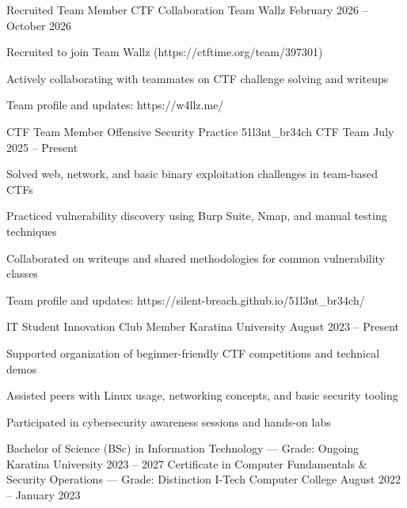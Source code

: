 \documentclass[]{resume-format}
\begin{document}
\begin{cventries}
    \cventry
    { Recruited Team Member \textbar{} CTF Collaboration }
    { Team Wallz }
    {}
    { February 2026 – October 2026 }
    {\begin{cvitems}
        \item { Recruited to join Team Wallz (https://ctftime.org/team/397301) }
        \item { Actively collaborating with teammates on CTF challenge solving and writeups }
        \item { Team profile and updates: https://w4llz.me/ }
    \end{cvitems}}
    \cventry
    { CTF Team Member \textbar{} Offensive Security Practice }
    { 51l3nt\_br34ch CTF Team }
    {}
    { July 2025 – Present }
    {\begin{cvitems}
        \item { Solved web, network, and basic binary exploitation challenges in team-based CTFs }
        \item { Practiced vulnerability discovery using Burp Suite, Nmap, and manual testing techniques }
        \item { Collaborated on writeups and shared methodologies for common vulnerability classes }
        \item { Team profile and updates: https://silent-breach.github.io/51l3nt\_br34ch/ }
    \end{cvitems}}
    \cventry
    { IT Student \textbar{} Innovation Club Member }
    { Karatina University }
    {}
    { August 2023 – Present }
    {\begin{cvitems}
        \item { Supported organization of beginner-friendly CTF competitions and technical demos }
        \item { Assisted peers with Linux usage, networking concepts, and basic security tooling }
        \item { Participated in cybersecurity awareness sessions and hands-on labs }
    \end{cvitems}}
\end{cventries}




\begin{cventries}
    \cventry
    { Bachelor of Science (BSc) in Information Technology — Grade: Ongoing }
    { Karatina University }
    {}
    { 2023 – 2027 }
    {}
    \cventry
    { Certificate in Computer Fundamentals \& Security Operations — Grade: Distinction }
    { I-Tech Computer College }
    {}
    { August 2022 – January 2023 }
    {}
\end{cventries}
\end{document}
